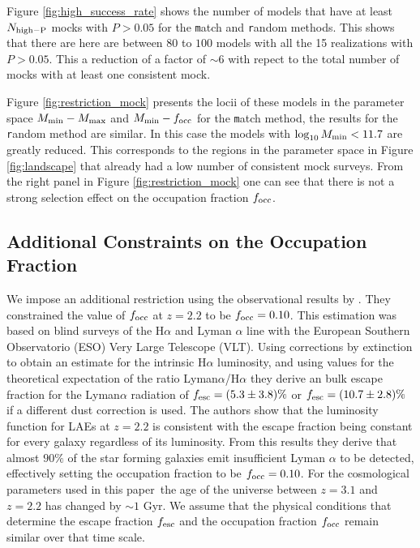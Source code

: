 \documentclass[usenatbib]{mn2e}
\newcommand{\documentname}{paper~}
\begin{document}
Figure \ref{fig:high_success_rate} shows the number of models
that have at least $N_{\rm high-P}$ mocks with $P>0.05$ for the {\texttt
  match} and {\texttt random} methods.  This shows that there are
here are between $80$ to $100$ models with all the 15 realizations with
$P>0.05$. This a reduction of a factor of $\sim 6$ with repect to the
total number of mocks with at least one consistent mock. 

Figure \ref{fig:restriction_mock} presents the locii of these models
in the parameter space $M_{\rm min}-M_{\rm max}$ and $M_{\rm
  min}-f_{\rm occ}$ for the {\texttt match} method, the results for
the {\texttt random} method are similar. In this case the models with
$\log_{10}M_{\rm min}< 11.7$ are greatly reduced. This corresponds to
the regions in the parameter space in Figure \ref{fig:landscape} that
already had a low number of consistent mock surveys. From the right
panel in Figure \ref{fig:restriction_mock} one can see that there is
not a strong selection effect on the occupation fraction $f_{\rm
  occ}$. 

\subsection{Additional  Constraints on the Occupation Fraction}

We impose an additional restriction using the observational results
by \cite{Hayes2010}. They constrained the value of $f_{\rm
  occ}$ at $z=2.2$ to be $f_{\rm occ}=0.10$. This estimation was based
on blind surveys of the H$\alpha$ and Lyman $\alpha$ line with the European Southern
Observatorio (ESO) Very Large Telescope (VLT). Using corrections by
extinction to obtain an estimate for the intrinsic H$\alpha$
luminosity, and using values for the theoretical expectation of the
ratio Lyman$\alpha$/H$\alpha$ they derive an bulk escape fraction for
the Lyman$\alpha$ radiation of $f_{\rm esc}=(5.3\pm 3.8)\%$ or $f_{\rm
esc}=(10.7\pm 2.8)\%$ if a different dust correction is used. The
authors show that the luminosity function for LAEs at $z=2.2$ is
consistent with the escape fraction being constant for every galaxy
regardless of its luminosity. From this results they derive that
almost $90\%$ of the star forming galaxies emit insufficient
Lyman $\alpha$ to be detected, effectively setting the occupation
fraction to be $f_{\rm occ}=0.10$. For the cosmological parameters
used in this \documentname the age of the universe between $z=3.1$ and
$z=2.2$ has changed by $\sim 1$ Gyr. We assume that the physical
conditions that determine the escape fraction $f_{\rm esc}$ and the
occupation fraction $f_{\rm  occ}$ remain similar over that time
scale.
\end{document}
